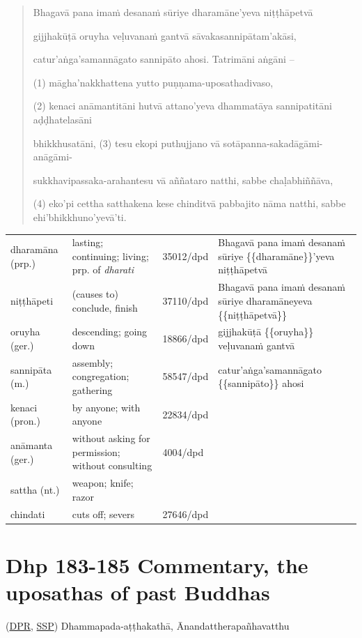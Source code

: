 \documentclass[11pt,oneside]{memoir}
\begin{document}
\vspace*{-\baselineskip}

\begin{quote}
Bhagavā pana imaṁ desanaṁ sūriye dharamāne'yeva niṭṭhāpetvā

gijjhakūṭā oruyha veḷuvanaṁ gantvā sāvakasannipātam'akāsi,

catur'aṅga'samannāgato sannipāto ahosi. Tatrimāni aṅgāni –

(1) māgha'nakkhattena yutto puṇṇama-uposathadivaso,

(2) kenaci anāmantitāni hutvā attano'yeva dhammatāya sannipatitāni aḍḍhatelasāni

bhikkhusatāni, (3) tesu ekopi puthujjano vā sotāpanna-sakadāgāmi-anāgāmi-

sukkhavipassaka-arahantesu vā aññataro natthi, sabbe chaḷabhiññāva,

(4) eko'pi cettha satthakena kese chinditvā pabbajito nāma natthi, sabbe ehi'bhikkhuno'yevā'ti.
\end{quote}

\begin{longtable}{L{\colOne} L{\colTwo} H H}
dharamāna (prp.) & lasting; continuing; living; prp. of \emph{dharati} & 35012/dpd & Bhagavā pana imaṁ desanaṁ sūriye \{\{dharamāne\}\}'yeva niṭṭhāpetvā\\[0pt]
niṭṭhāpeti & (causes to) conclude, finish & 37110/dpd & Bhagavā pana imaṁ desanaṁ sūriye dharamāneyeva \{\{niṭṭhāpetvā\}\}\\[0pt]
oruyha (ger.) & descending; going down & 18866/dpd & gijjhakūṭā \{\{oruyha\}\} veḷuvanaṁ gantvā\\[0pt]
sannipāta (m.) & assembly; congregation; gathering & 58547/dpd & catur'aṅga'samannāgato \{\{sannipāto\}\} ahosi\\[0pt]
kenaci (pron.) & by anyone; with anyone & 22834/dpd & \\[0pt]
anāmanta (ger.) & without asking for permission; without consulting & 4004/dpd & \\[0pt]
sattha (nt.) & weapon; knife; razor &  & \\[0pt]
chindati & cuts off; severs & 27646/dpd & \\[0pt]
\end{longtable}

\section{Dhp 183-185 Commentary, the uposathas of past Buddhas}
\label{sec:orgc524770}
(\href{https://www.digitalpalireader.online/\_dprhtml/index.html?loc=k.1.0.1.5.3.0.a}{DPR}, \href{http://localhost:4848/suttas/s0502a.att/pli/cst4?quote=m\%25C4\%2581t\%25C4\%2581pitaro\%2520\%25C4\%2581yuparicchedo\%2520bodhi\%2520s\%25C4\%2581vakasannip\%25C4\%2581to\&window\_type=Sutta+Study}{SSP}) Dhammapada-aṭṭhakathā, Ānandattherapañhavatthu
\end{document}
